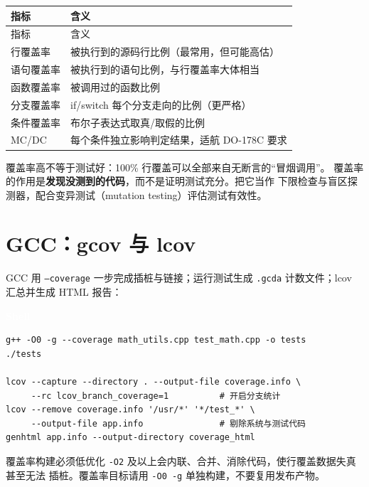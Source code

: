 \documentclass[12pt,a4paper,fontset=fandol]{ctexbook}
\newcommand{\bashlabel}{%
  \begin{tcolorbox}[enhanced,colback=black!80,colframe=black!80,
    arc=1mm,boxrule=0mm,left=6pt,right=6pt,top=2pt,bottom=2pt,
    halign=left,oversize]
    \textcolor{white}{\small\bfseries Shell}
  \end{tcolorbox}\vspace{-4pt}}
\begin{document}
\begin{center}
\scriptsize
\setlength{\tabcolsep}{4pt}
\begin{longtable}{p{3.0cm}p{10.0cm}}
\toprule
指标 & 含义 \\
\midrule
\endfirsthead
\toprule
指标 & 含义 \\
\midrule
\endhead
行覆盖率 & 被执行到的源码行比例（最常用，但可能高估） \\
语句覆盖率 & 被执行到的语句比例，与行覆盖率大体相当 \\
函数覆盖率 & 被调用过的函数比例 \\
分支覆盖率 & if/switch 每个分支走向的比例（更严格） \\
条件覆盖率 & 布尔子表达式取真/取假的比例 \\
MC/DC & 每个条件独立影响判定结果，适航 DO-178C 要求 \\
\bottomrule
\end{longtable}
\end{center}

\begin{note}
覆盖率高不等于测试好：100\% 行覆盖可以全部来自无断言的“冒烟调用”。
覆盖率的作用是\textbf{发现没测到的代码}，而不是证明测试充分。把它当作
下限检查与盲区探测器，配合变异测试（mutation testing）评估测试有效性。
\end{note}

\section{GCC：gcov 与 lcov}

GCC 用 \texttt{--coverage} 一步完成插桩与链接；运行测试生成
\texttt{.gcda} 计数文件；lcov 汇总并生成 HTML 报告：

\bashlabel
\begin{lstlisting}
g++ -O0 -g --coverage math_utils.cpp test_math.cpp -o tests
./tests

lcov --capture --directory . --output-file coverage.info \
     --rc lcov_branch_coverage=1          # 开启分支统计
lcov --remove coverage.info '/usr/*' '*/test_*' \
     --output-file app.info               # 剔除系统与测试代码
genhtml app.info --output-directory coverage_html
\end{lstlisting}

\begin{warning}{覆盖率构建必须低优化}
\texttt{-O2} 及以上会内联、合并、消除代码，使行覆盖数据失真甚至无法
插桩。覆盖率目标请用 \texttt{-O0 -g} 单独构建，不要复用发布产物。
\end{warning}
\end{document}
